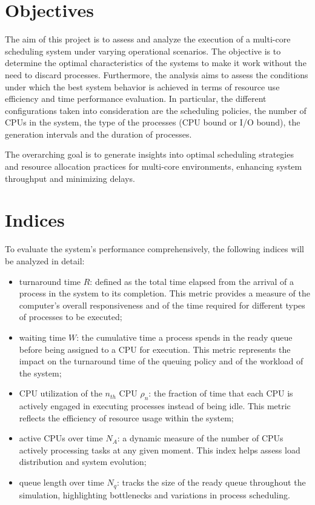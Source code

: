 \section{Objectives}

The aim of this project is to assess and analyze the execution of a multi-core scheduling system under varying operational scenarios. The objective is to determine the optimal characteristics of the systems to make it work without the need to discard processes. Furthermore, the analysis aims to assess the conditions under which the best system behavior is achieved in terms of resource use efficiency and time performance evaluation. In particular, the different configurations taken into consideration are the scheduling policies, the number of CPUs in the system, the type of the processes (CPU bound or I/O bound), the generation intervals and the duration of processes.

The overarching goal is to generate insights into optimal scheduling strategies and resource allocation practices for multi-core environments, enhancing system throughput and minimizing delays.


\section{Indices}

To evaluate the system’s performance comprehensively, the following indices will be analyzed in detail:
\begin{itemize}
    \item turnaround time $R$: defined as the total time elapsed from the arrival of a process in the system to its completion. This metric provides a measure of the computer’s overall responsiveness and of the time required for different types of processes to be executed;
    \item waiting time $W$: the cumulative time  a process spends in the ready queue before being assigned to a CPU for execution. This metric represents the impact on the turnaround time of the queuing policy and of the workload of the system;
    \item CPU utilization of the $n_{th}$ CPU $\rho_n$: the fraction of time that each CPU is actively engaged in executing processes instead of being idle. This metric reflects the efficiency of resource usage within the system;
    \item active CPUs over time $N_A$: a dynamic measure of the number of CPUs actively processing tasks at any given moment. This index helps assess load distribution and system evolution;
    \item queue length over time $N_q$: tracks the size of the ready queue throughout the simulation, highlighting bottlenecks and variations in process scheduling.
\end{itemize}

